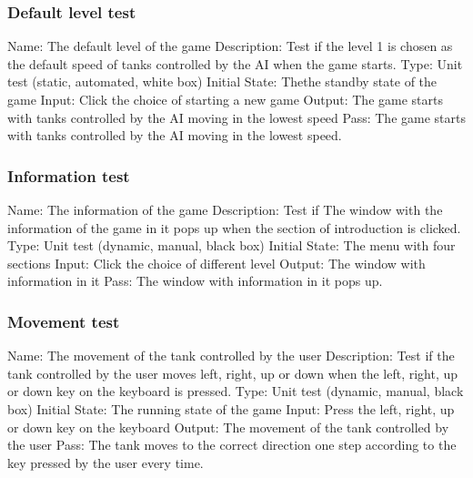 \documentclass{article}
\begin{document}
\subsubsection{Default level test}
Name:  The default level of the game\newline
Description: Test if the level 1 is chosen as the default speed of tanks controlled by the AI when the game starts. \newline
Type: Unit test (static, automated, white box) \newline
Initial State:  Thethe standby state of the game \newline
Input: Click the choice of starting a new game\newline
Output: The game starts with tanks controlled by the AI moving in the lowest speed\newline
Pass: The game starts with tanks controlled by the AI moving in the lowest speed. \newline

\subsubsection{Information test}
Name:  The information of the game\newline
Description: Test if The window with the information of the game in it pops up when the section of introduction is clicked. \newline
Type: Unit test (dynamic, manual, black box) \newline
Initial State:  The menu with four sections \newline
Input: Click the choice of different level\newline
Output: The window with information in it \newline
Pass:  The window with information in it pops up. \newline

\subsubsection{Movement test}
Name:  The movement of the tank controlled by the user\newline
Description: Test if the tank controlled by the user moves left, right, up or down when the left, right, up or down key on the keyboard is pressed. \newline
Type: Unit test (dynamic, manual, black box) \newline
Initial State:  The running state of the game \newline
Input: Press the left, right, up or down key on the keyboard\newline
Output: The movement of the tank controlled by the user \newline
Pass: The tank moves to the correct direction one step according to the key pressed by the user every time. \newline
\end{document}
